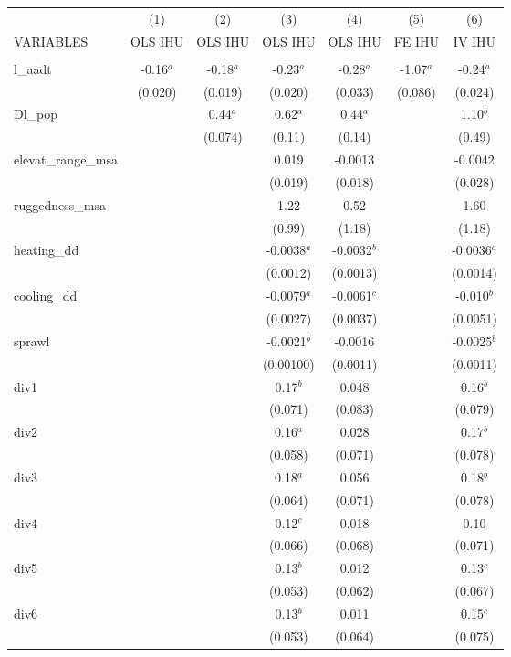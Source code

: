 \documentclass[]{article}
\begin{document}
\begin{tabular}{lcccccc} \hline
 & (1) & (2) & (3) & (4) & (5) & (6) \\
VARIABLES & OLS IHU & OLS IHU & OLS IHU & OLS IHU & FE IHU & IV IHU \\ \hline
 &  &  &  &  &  &  \\
l\_aadt & -0.16$^a$ & -0.18$^a$ & -0.23$^a$ & -0.28$^a$ & -1.07$^a$ & -0.24$^a$ \\
 & (0.020) & (0.019) & (0.020) & (0.033) & (0.086) & (0.024) \\
Dl\_pop &  & 0.44$^a$ & 0.62$^a$ & 0.44$^a$ &  & 1.10$^b$ \\
 &  & (0.074) & (0.11) & (0.14) &  & (0.49) \\
elevat\_range\_msa &  &  & 0.019 & -0.0013 &  & -0.0042 \\
 &  &  & (0.019) & (0.018) &  & (0.028) \\
ruggedness\_msa &  &  & 1.22 & 0.52 &  & 1.60 \\
 &  &  & (0.99) & (1.18) &  & (1.18) \\
heating\_dd &  &  & -0.0038$^a$ & -0.0032$^b$ &  & -0.0036$^a$ \\
 &  &  & (0.0012) & (0.0013) &  & (0.0014) \\
cooling\_dd &  &  & -0.0079$^a$ & -0.0061$^c$ &  & -0.010$^b$ \\
 &  &  & (0.0027) & (0.0037) &  & (0.0051) \\
sprawl &  &  & -0.0021$^b$ & -0.0016 &  & -0.0025$^b$ \\
 &  &  & (0.00100) & (0.0011) &  & (0.0011) \\
div1 &  &  & 0.17$^b$ & 0.048 &  & 0.16$^b$ \\
 &  &  & (0.071) & (0.083) &  & (0.079) \\
div2 &  &  & 0.16$^a$ & 0.028 &  & 0.17$^b$ \\
 &  &  & (0.058) & (0.071) &  & (0.078) \\
div3 &  &  & 0.18$^a$ & 0.056 &  & 0.18$^b$ \\
 &  &  & (0.064) & (0.071) &  & (0.078) \\
div4 &  &  & 0.12$^c$ & 0.018 &  & 0.10 \\
 &  &  & (0.066) & (0.068) &  & (0.071) \\
div5 &  &  & 0.13$^b$ & 0.012 &  & 0.13$^c$ \\
 &  &  & (0.053) & (0.062) &  & (0.067) \\
div6 &  &  & 0.13$^b$ & 0.011 &  & 0.15$^c$ \\
 &  &  & (0.053) & (0.064) &  & (0.075) \\

\end{tabular}
\end{document}
